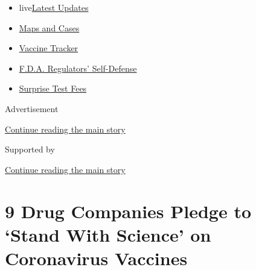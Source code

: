 \begin{itemize}
\tightlist
\item
  live\href{https://www.nytimes3xbfgragh.onion/2020/09/12/world/covid-19-coronavirus.html?name=styln-coronavirus-national\&region=TOP_BANNER\&block=storyline_menu_recirc\&action=click\&pgtype=Article\&impression_id=29b8b811-f528-11ea-8964-d1c7703f36aa\&variant=undefined}{Latest
  Updates}
\item
  \href{https://www.nytimes3xbfgragh.onion/interactive/2020/us/coronavirus-us-cases.html?name=styln-coronavirus-national\&region=TOP_BANNER\&block=storyline_menu_recirc\&action=click\&pgtype=Article\&impression_id=29b8b812-f528-11ea-8964-d1c7703f36aa\&variant=undefined}{Maps
  and Cases}
\item
  \href{https://www.nytimes3xbfgragh.onion/interactive/2020/science/coronavirus-vaccine-tracker.html?name=styln-coronavirus-national\&region=TOP_BANNER\&block=storyline_menu_recirc\&action=click\&pgtype=Article\&impression_id=29b8b813-f528-11ea-8964-d1c7703f36aa\&variant=undefined}{Vaccine
  Tracker}
\item
  \href{https://www.nytimes3xbfgragh.onion/2020/09/10/us/politics/fda-coronavirus-vaccine.html?name=styln-coronavirus-national\&region=TOP_BANNER\&block=storyline_menu_recirc\&action=click\&pgtype=Article\&impression_id=29b8b814-f528-11ea-8964-d1c7703f36aa\&variant=undefined}{F.D.A.
  Regulators' Self-Defense}
\item
  \href{https://www.nytimes3xbfgragh.onion/2020/09/09/upshot/coronavirus-surprise-test-fees.html?name=styln-coronavirus-national\&region=TOP_BANNER\&block=storyline_menu_recirc\&action=click\&pgtype=Article\&impression_id=29b8df20-f528-11ea-8964-d1c7703f36aa\&variant=undefined}{Surprise
  Test Fees}
\end{itemize}

Advertisement

\protect\hyperlink{after-top}{Continue reading the main story}

Supported by

\protect\hyperlink{after-sponsor}{Continue reading the main story}

\hypertarget{9-drug-companies-pledge-to-stand-with-science-on-coronavirus-vaccines}{%
\section{9 Drug Companies Pledge to `Stand With Science' on Coronavirus
Vaccines}\label{9-drug-companies-pledge-to-stand-with-science-on-coronavirus-vaccines}}

